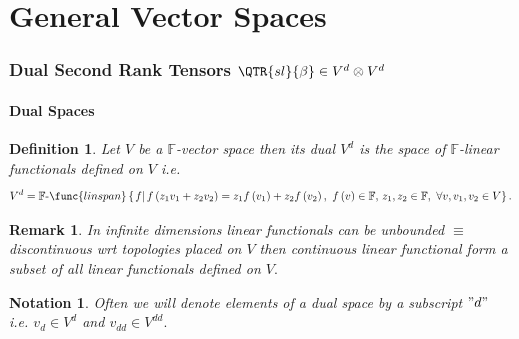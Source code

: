 \documentclass[aps,preprint]{revtex4}
\newtheorem{definition}[theorem]{Definition}
\newtheorem{notation}[theorem]{Notation}
\newtheorem{remark}[theorem]{Remark}
\begin{document}
\part{General Vector Spaces \label{GENERAL VECTOR SPACES}}

\section{Dual Second Rank Tensors $\QTR{sl}{\protect\beta }\in V^{d}\otimes
V^{d}$}

\subsection{Dual Spaces}

\begin{definition}
Let $V$ be a $\mathbb{F}$-vector space then its dual $V^{d}$ is the space of 
$\mathbb{F}$-linear functionals defined on $V$ i.e. 
\begin{equation}
V^{d}=\mathbb{F}\text{-}\func{linspan}\left\{ \left. f\right\vert f\left(
z_{1}v_{1}+z_{2}v_{2}\right) =z_{1}f\left( v_{1}\right) +z_{2}f\left(
v_{2}\right) ,\,\,f\left( v\right) \in \mathbb{F},\,z_{1},z_{2}\in \mathbb{F}%
,\,\,\forall v,v_{1},v_{2}\in V\right\} .
\end{equation}
\end{definition}

\begin{remark}
In infinite dimensions linear functionals can be unbounded $\equiv $
discontinuous wrt topologies placed on $V$ then continuous linear functional
form a subset of all linear functionals defined on $V.$
\end{remark}

\begin{notation}
Often we will denote elements of a dual space by a subscript $"d"$ i.e. $%
v_{d}\in V^{d}$ and $v_{dd}\in V^{dd}.$
\end{notation}
\end{document}
